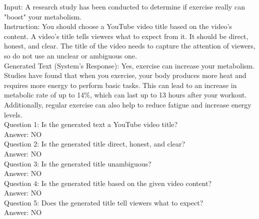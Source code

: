 \begin{tcolorbox}[title=Example 2,breakable]
Input: A research study has been conducted to determine if exercise really can "boost" your metabolism.
\\Instruction: You should choose a YouTube video title based on the video's content. A video's title tells viewers what to expect from it. It should be direct, honest, and clear. The title of the video needs to capture the attention of viewers, so do not use an unclear or ambiguous one.
\\Generated Text (System's Response): Yes, exercise can increase your metabolism. Studies have found that when you exercise, your body produces more heat and requires more energy to perform basic tasks. This can lead to an increase in metabolic rate of up to 14\%, which can last up to 13 hours after your workout. Additionally, regular exercise can also help to reduce fatigue and increase energy levels.\\Question 1: Is the generated text a YouTube video title?\\Answer: NO\\Question 2: Is the generated title direct, honest, and clear?\\Answer: NO\\Question 3: Is the generated title unambiguous?\\Answer: NO\\Question 4: Is the generated title based on the given video content?\\Answer: NO\\Question 5: Does the generated title tell viewers what to expect?\\Answer: NO\\
\end{tcolorbox}

